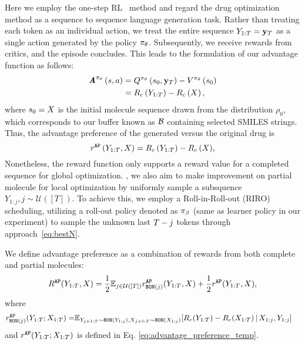 {
Here we employ the one-step RL~\citep{brandfonbrener2021offline, peng2019advantage} method and regard the drug optimization method as a {sequence to sequence} language generation task. 
Rather than treating each token as an individual action, we treat the entire sequence $Y_{1:T}=\mathbf{y}_{T}$ as a single action generated by the policy $\pi_{{\theta}}$. Subsequently, we receive rewards from critics, and the episode concludes. This leads to the formulation of our advantage function as follows:}
\begin{align}\label{eq:advantage}
\textbf{\em A}^{\pi_{{\theta}}} \left( {s,a} \right) &=Q^{\pi_{{\theta}}} \left( {s_0,
\mathbf{y}_{T}} \right) -V^{\pi_{{\theta}}} \left( {s_0} \right) \\
&=R_c \left( {Y_{1:T}} \right) -R_c \left( {X} \right) ,
\end{align}
where $s_0=X$ is the initial molecule sequence drawn from the distribution $\rho_0$, which corresponds to our buffer known as $\mathcal{B}$ {containing selected SMILES strings}.
Thus, the advantage preference of the generated versus the original drug is
\begin{equation}\label{eq:advantage_preference_temp}
r^{\mathtt{AP}} \left( {Y_{1:T},X} \right)  ={R_c \left( {Y_{1:T}} \right)  - R_c \left( {X} \right) },
\end{equation}
Nonetheless, the reward function only supports a reward value for a completed sequence for global optimization. , we also aim to make improvement on partial molecule for local optimization by uniformly sample a subsquence $Y_{1:j},j \sim \mathcal{U}([T])$. 
To achieve this, we employ a Roll-in-Roll-out (RIRO) \citep{ross2014reinforcement, cheng2020policy,liu2023active,liu2023blending} scheduling, utilizing a roll-out policy denoted as $\pi_\beta$ (same as learner policy in our experiment) to sample the unknown last $T-j$ tokens through \fix{$\bestN$} approach~\eqref{eq:bestN}. 

\vspace{+0.2cm}
\begin{definition} {We define advantage preference as a combination of rewards from both complete and partial molecules:} 
\vspace{+0.2cm}
\begin{align}\label{eq:advantage_preference}
    R^{\mathtt{AP}}(Y_{1:T}, X) = \frac 1 2 \mathbb{E}_{j\in \mathcal{U}([T])} r_{{\mathtt{BON}}(j)}^{\mathtt{AP}}(Y_{1:T}, X) + \frac 1 2 r^{\mathtt{AP}}(Y_{1:T},X),
\end{align}
where 
\begin{align*}
r_{{\mathtt{BON}}(j)}^{\mathtt{AP}}(Y_{1:T}; X_{1:T})=&\mathbb{E}_{Y_{j+1:T}\sim {\mathtt{BON}}(Y_{1:j}),X_{j+1:T}\sim {\mathtt{BON}}(X_{1:j})}[ 
R_c(Y_{1:T}) - R_c(X_{1:T}){\,|\,} X_{1:j}, Y_{1:j}]
\end{align*}
and $r^{\mathtt{AP}}(Y_{1:T}; X_{1:T})$ is defined in Eq. \eqref{eq:advantage_preference_temp}.
\end{definition}

